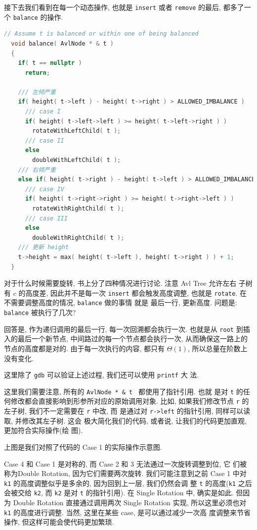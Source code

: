 \documentclass[a4paper]{ctexart}
\theoremstyle{definition}
\theoremstyle{definition}
\begin{document}
接下去我们看到在每一个动态操作, 也就是 \verb|insert| 或者
\verb|remove| 的最后, 都多了一个 \verb|balance| 的操作.

\begin{lstlisting}[language=C++]
  // Assume t is balanced or within one of being balanced
  void balance( AvlNode * & t )
  {
    if( t == nullptr )
      return;

    /// 左倾严重  
    if( height( t->left ) - height( t->right ) > ALLOWED_IMBALANCE )
      /// case I
      if( height( t->left->left ) >= height( t->left->right ) )
        rotateWithLeftChild( t );
      /// case II
      else
        doubleWithLeftChild( t );
    /// 右倾严重  
    else if( height( t->right ) - height( t->left ) > ALLOWED_IMBALANCE )
      /// case IV
      if( height( t->right->right ) >= height( t->right->left ) )
        rotateWithRightChild( t );
      /// case III
      else
        doubleWithRightChild( t );
    /// 更新 height            
    t->height = max( height( t->left ), height( t->right ) ) + 1;
  }
\end{lstlisting}

对于什么时候需要旋转, 书上分了四种情况进行讨论. 注意 Avl Tree 允许左右
子树有 $c$ 的高度差, 因此并不是每一次 \verb|insert| 都会触发高度调整,
也就是 \verb|rotate|. 在不需要调整高度的情况, \verb|balance| 做的事情
就是 最后一行, 更新高度. 问题是: \verb|balance| 被执行了几次?

回答是, 作为递归调用的最后一行, 每一次回溯都会执行一次. 也就是从
\verb|root| 到插入的最后一个新节点, 中间路过的每一个节点都会执行一次,
从而确保这一路上的节点的高度都是对的. 由于每一次执行的内容, 都只有
$\Theta(1)$, 所以总量在阶数上没有变化.

这里除了 \verb|gdb| 可以验证上述过程, 我们还可以使用 \verb|printf| 大
法.

这里我们需要注意, 所有的 \verb|AvlNode * & t | 都使用了指针引用. 也就
是对 \verb|t| 的任何修改都会直接影响到形参所对应的原始调用对象. 比如,
如果我们修改节点 \verb|r| 的左子树, 我们不一定需要在 \verb|r| 中改, 而
是通过对 \verb|r->left| 的指针引用, 同样可以读取, 并修改其左子树. 这会
极大简化我们的代码, 或者说, 让我们的代码更加直观, 更加符合实际操作(绘
图).


上图是我们对照了代码的 Case 1 的实际操作示意图.

Case 4 和 Case 1 是对称的, 而 Case 2 和 3 无法通过一次旋转调整到位, 它
们被称为Double Rotation, 因为它们需要两次旋转. 我们可能注意到之前 Case
1 中对 \verb|k1| 的高度调整似乎是多余的, 因为回到上一层, 我们仍然会调
整 \verb|t| 的高度(\verb|k1| 之后会被交给 \verb|k2|, 而 \verb|k2| 是对
\verb|t| 的指针引用). 在 Single Rotation 中, 确实是如此. 但因为 Double
Rotation 直接通过调用两次 Single Rotation 实现, 所以这里必须也对
\verb|k1| 的高度进行调整. 当然, 这里在某些 case, 是可以通过减少一次高
度调整来节省操作, 但这样可能会使代码更加繁琐.
\end{document}
